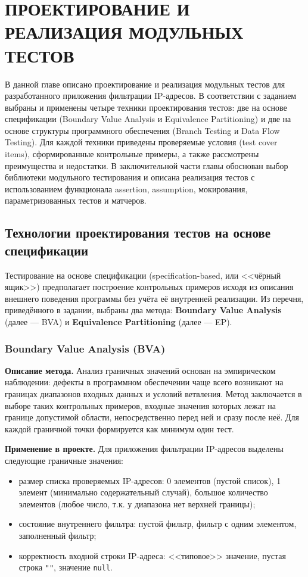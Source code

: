 \chapter{ПРОЕКТИРОВАНИЕ И РЕАЛИЗАЦИЯ МОДУЛЬНЫХ ТЕСТОВ} \label{ch3}

В данной главе описано проектирование и реализация модульных тестов для разработанного приложения фильтрации IP-адресов. В соответствии с заданием выбраны и применены четыре техники проектирования тестов: две на основе спецификации (Boundary Value Analysis и Equivalence Partitioning) и две на основе структуры программного обеспечения (Branch Testing и Data Flow Testing). Для каждой техники приведены проверяемые условия (test cover items), сформированные контрольные примеры, а также рассмотрены преимущества и недостатки. В заключительной части главы обоснован выбор библиотеки модульного тестирования и описана реализация тестов с использованием функционала assertion, assumption, мокирования, параметризованных тестов и матчеров.

\section{Технологии проектирования тестов на основе спецификации} \label{ch3:sec1}

Тестирование на основе спецификации (specification-based, или <<чёрный ящик>>) предполагает построение контрольных примеров исходя из описания внешнего поведения программы без учёта её внутренней реализации. Из перечня, приведённого в задании, выбраны два метода: \textbf{Boundary Value Analysis} (далее --- BVA) и \textbf{Equivalence Partitioning} (далее --- EP).

\subsection{Boundary Value Analysis (BVA)} \label{ch3:sec1:bva}

\textbf{Описание метода.} Анализ граничных значений основан на эмпирическом наблюдении: дефекты в программном обеспечении чаще всего возникают на границах диапазонов входных данных и условий ветвления. Метод заключается в выборе таких контрольных примеров, входные значения которых лежат на границе допустимой области, непосредственно перед ней и сразу после неё. Для каждой граничной точки формируется как минимум один тест.

\textbf{Применение в проекте.} Для приложения фильтрации IP-адресов выделены следующие граничные значения:
\begin{itemize}
    \item размер списка проверяемых IP-адресов: 0 элементов (пустой список), 1 элемент (минимально содержательный случай), большое количество элементов (любое число, т.к. у диапазона нет верхней границы);
    \item состояние внутреннего фильтра: пустой фильтр, фильтр с одним элементом, заполненный фильтр;
    \item корректность входной строки IP-адреса: <<типовое>> значение, пустая строка \texttt{""}, значение \texttt{null}.
\end{itemize}

